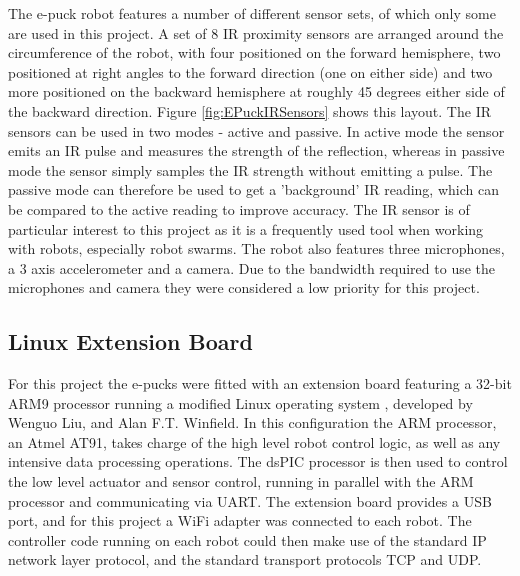 The e-puck robot features a number of different sensor sets, of which only some are used in this project. A set of 8 IR proximity sensors are arranged around the circumference of the robot, with four positioned on the forward hemisphere, two positioned at right angles to the forward direction (one on either side) and two more positioned on the backward hemisphere at roughly 45 degrees either side of the backward direction. Figure \ref{fig:EPuckIRSensors} shows this layout. The IR sensors can be used in two modes - active and passive. In active mode the sensor emits an IR pulse and measures the strength of the reflection, whereas in passive mode the sensor simply samples the IR strength without emitting a pulse. The passive mode can therefore be used to get a 'background' IR reading, which can be compared to the active reading to improve accuracy. The IR sensor is of particular interest to this project as it is a frequently used tool when working with robots, especially robot swarms. The robot also features three microphones, a 3 axis accelerometer and a camera. Due to the bandwidth required to use the microphones and camera they were considered a low priority for this project.


\subsection{Linux Extension Board} \label{LinuxExtensionBoard}
For this project the e-pucks were fitted with an extension board featuring a 32-bit ARM9 processor running a modified Linux operating system \cite{LinuxExtensionBoard}, developed by Wenguo Liu, and Alan F.T. Winfield. In this configuration the ARM processor, an Atmel AT91, takes charge of the high level robot control logic, as well as any intensive data processing operations. The dsPIC processor is then used to control the low level actuator and sensor control, running in parallel with the ARM processor and communicating via UART. The extension board provides a USB port, and for this project a WiFi adapter was connected to each robot. The controller code running on each robot could then make use of the standard IP network layer protocol, and the standard transport protocols TCP and UDP.


